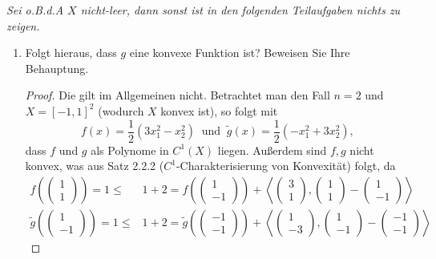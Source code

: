 \documentclass[12pt]{extreport} %
\begin{document}
\textit{Sei o.B.d.A $X$ nicht-leer, dann sonst ist in den folgenden Teilaufgaben nichts zu zeigen.}	
	
\begin{enumerate}
	\item Folgt hieraus, dass $g$ eine konvexe Funktion ist? Beweisen Sie Ihre Behauptung.
		\begin{proof}
			Die gilt im Allgemeinen nicht. Betrachtet man den Fall $n = 2$ und $X = [-1, 1]^2$ (wodurch $X$ konvex ist), so folgt mit 
			$$ f(x) = \frac{1}{2} \left( 3 x_1^2 -  x_2^2 \right) ~ \text{ und } ~ \tilde{g}(x) = \frac{1}{2} \left( -x_1^2 + 3 x_2^2 \right), $$
			 dass $f$ und $g$ als Polynome in $C^1(X)$ liegen. Außerdem sind $f, g$ nicht konvex, was aus Satz 2.2.2 ($C^1$-Charakterisierung von Konvexität) folgt, da
			\begin{align*}
				f \left(\begin{pmatrix} 1 \\ 1 \end{pmatrix} \right) = 1 \leq & 1 + 2 = f \left(\begin{pmatrix} 1 \\ -1 \end{pmatrix} \right) + \left\langle \begin{pmatrix} 3 \\ 1 \end{pmatrix} ,  \begin{pmatrix} 1 \\ 1 \end{pmatrix} -  \begin{pmatrix} 1 \\ -1 \end{pmatrix} \right\rangle \\
				\tilde{g} \left(\begin{pmatrix} 1 \\ -1 \end{pmatrix} \right) = 1 \leq & 1 + 2 = \tilde{g} \left(\begin{pmatrix} -1 \\ -1 \end{pmatrix} \right) + \left\langle \begin{pmatrix} 1 \\ -3 \end{pmatrix} ,  \begin{pmatrix} 1 \\ -1 \end{pmatrix} -  \begin{pmatrix} -1 \\ -1 \end{pmatrix} \right\rangle \

\end{align*}
\end{proof}
\end{enumerate}
\end{document}
